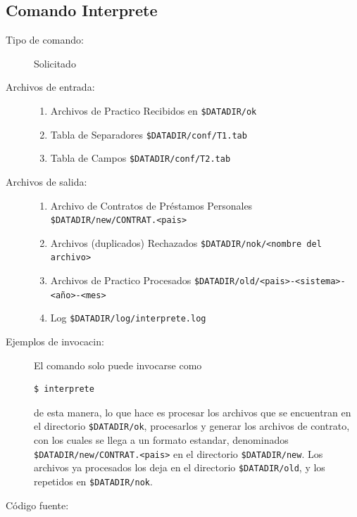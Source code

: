 \documentclass[12pt]{article}
\begin{document}
\subsection{Comando Interprete}
\begin{description}
	\item [Tipo de comando:] Solicitado
	
	\item [Archivos de entrada:]
	\begin{enumerate}
		\item Archivos de Practico Recibidos en \verb|$DATADIR/ok|
		\item Tabla de Separadores \verb|$DATADIR/conf/T1.tab|
		\item Tabla de Campos \verb|$DATADIR/conf/T2.tab|
	\end{enumerate}
	
	\item [Archivos de salida:]
	\begin{enumerate}
		\item Archivo de Contratos de Préstamos Personales \verb|$DATADIR/new/CONTRAT.<pais>|
		\item Archivos (duplicados) Rechazados \verb|$DATADIR/nok/<nombre del archivo>|
		\item Archivos de Practico Procesados \verb|$DATADIR/old/<pais>-<sistema>-<año>-<mes>|
		\item Log \verb|$DATADIR/log/interprete.log|
	\end{enumerate}
	
	\item [Ejemplos de invocacin:]	El comando solo puede invocarse como
	\begin{verbatim}$ interprete\end{verbatim}
	de esta manera, lo que hace es procesar los archivos que se encuentran en el directorio \verb|$DATADIR/ok|, procesarlos y generar los archivos de contrato, con los cuales se llega a un formato estandar, denominados \verb|$DATADIR/new/CONTRAT.<pais>| en el directorio \verb|$DATADIR/new|. Los archivos ya procesados los deja en el directorio \verb|$DATADIR/old|, y los repetidos en \verb|$DATADIR/nok|.
	
	\item [Código fuente:]
\end{description}
{\footnotesize

}
\end{document}
